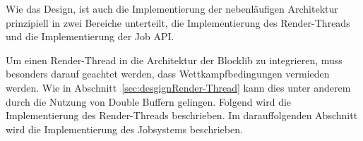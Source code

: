 Wie das Design, ist auch die Implementierung der nebenläufigen Architektur prinzipiell in zwei Bereiche unterteilt, die Implementierung des Render-Threads und die Implementierung der Job API.

Um einen Render-Thread in die Architektur der Blocklib zu integrieren, muss besonders darauf geachtet werden, dass Wettkampfbedingungen vermieden werden. Wie in Abschnitt~\ref{sec:desgignRender-Thread} kann dies unter anderem durch die Nutzung von Double Buffern gelingen. Folgend wird die Implementierung des Render-Threads beschrieben. Im darauffolgenden Abschnitt wird die Implementierung des Jobsystems beschrieben.